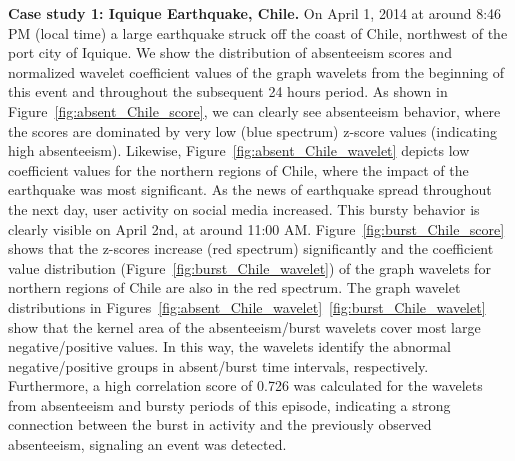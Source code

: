 \documentclass[twoside,leqno,twocolumn]{article}
\begin{document}
\textbf{Case study 1: Iquique Earthquake, Chile.}
On April 1, 2014 at around 8:46 PM (local time) a large earthquake struck off the coast of Chile, northwest of the port city of Iquique. We show the distribution of absenteeism scores and normalized wavelet coefficient values of the graph wavelets from the beginning of this event and throughout the subsequent 24 hours period. As shown in Figure~\ref{fig:absent_Chile_score}, we can clearly see absenteeism behavior, where the scores are dominated by very low (blue spectrum) z-score values (indicating high absenteeism). Likewise, Figure~\ref{fig:absent_Chile_wavelet} depicts low coefficient values for the northern regions of Chile, where the impact of the earthquake was most significant. As the news of earthquake spread throughout the next day, user activity on social media increased. This bursty behavior is clearly visible on April 2nd, at around 11:00 AM. Figure~\ref{fig:burst_Chile_score} shows that the z-scores increase (red spectrum) significantly and the coefficient value distribution (Figure~\ref{fig:burst_Chile_wavelet}) of the graph wavelets for northern regions of Chile are also in the red spectrum. The graph wavelet distributions in Figures~\ref{fig:absent_Chile_wavelet}~\ref{fig:burst_Chile_wavelet} show that the kernel area of the absenteeism/burst wavelets cover most large negative/positive values. In this way, the wavelets identify the abnormal negative/positive groups in absent/burst time intervals, respectively. Furthermore, a high correlation score of 0.726 was calculated for the wavelets from absenteeism and bursty periods of this episode, indicating a strong connection between the burst in activity and the previously observed absenteeism, signaling an event was detected.
\end{document}
